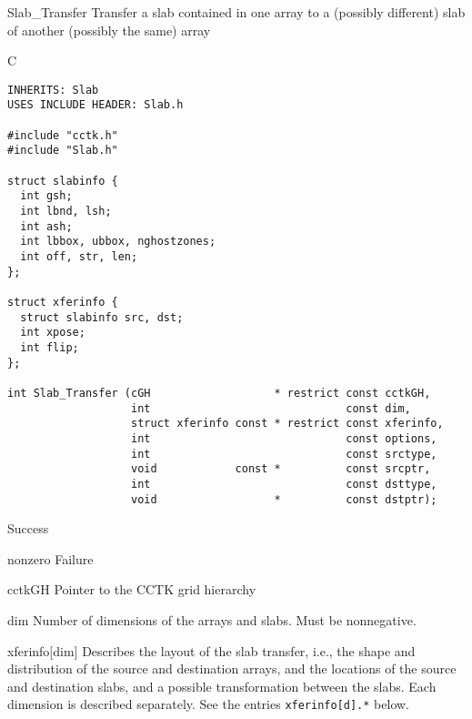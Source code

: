 \begin{FunctionDescription}{Slab\_Transfer}{}
Transfer a slab contained in one array to a (possibly different) slab
of another (possibly the same) array

\begin{SynopsisSection}
\begin{Synopsis}{C}
\begin{verbatim}
INHERITS: Slab
USES INCLUDE HEADER: Slab.h

#include "cctk.h"
#include "Slab.h"

struct slabinfo {
  int gsh;
  int lbnd, lsh;
  int ash;
  int lbbox, ubbox, nghostzones;
  int off, str, len;
};

struct xferinfo {
  struct slabinfo src, dst;
  int xpose;
  int flip;
};

int Slab_Transfer (cGH                   * restrict const cctkGH,
                   int                              const dim,
                   struct xferinfo const * restrict const xferinfo,
                   int                              const options,
                   int                              const srctype,
                   void            const *          const srcptr,
                   int                              const dsttype,
                   void                  *          const dstptr);
\end{verbatim}
\end{Synopsis}
\end{SynopsisSection}

\begin{ResultSection}
\begin{Result}{0}
Success
\end{Result}
\begin{Result}{nonzero}
Failure
\end{Result}
\end{ResultSection}

\begin{ParameterSection}
\begin{Parameter}{cctkGH}
Pointer to the CCTK grid hierarchy
\end{Parameter}

\begin{Parameter}{dim}
Number of dimensions of the arrays and slabs.  Must be nonnegative.
\end{Parameter}

\begin{Parameter}{xferinfo[dim]}
Describes the layout of the slab transfer, i.e., the shape and
distribution of the source and destination arrays, and the locations
of the source and destination slabs, and a possible transformation
between the slabs.  Each dimension is described separately.  See the
entries \texttt{xferinfo[d].*} below.
\end{Parameter}


\end{ParameterSection}
\end{FunctionDescription}
